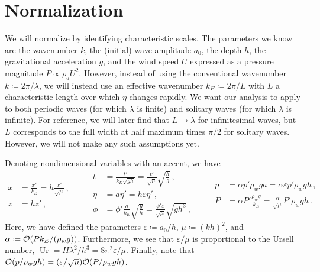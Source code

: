 \documentclass{jfm}
\DeclareMathOperator{\Ur}{Ur}
\renewcommand*{\epsilon}{\varepsilon}
\begin{document}
\section{Normalization}
We will normalize by identifying characteristic scales.
The parameters we know \apriori are the wavenumber $k$, the (initial)
wave amplitude $a_0$, the depth $h$, the gravitational acceleration $g$,
and the wind speed $U$ expressed as a pressure magnitude $P \propto
\rho_a U^2$.
However, instead of using the conventional wavenumber $k \coloneqq 2 \pi
/ \lambda$, we will instead use an effective wavenumber $k_E \coloneqq 2
\pi/ L$ with $L$ a characteristic length over which $\eta$ changes
rapidly.
We want our analysis to apply to both periodic waves (for which
$\lambda$ is finite) and solitary waves (for which $\lambda$ is
infinite).
For reference, we will later find that $L \to \lambda$ for infinitesimal
waves, but $L$ corresponds to the full width at half maximum times $\pi/2$ for solitary
waves.
However, we will not make any such assumptions yet.

Denoting nondimensional variables with an accent, we have
\begin{equation*}
  \begin{aligned}
  x &= \frac{x'}{k_E} = h \frac{x'}{\sqrt{\mu}}\,, \\
  z &= h z' \,,
  \end{aligned}
  \qquad
  \begin{aligned}
  t &= \frac{t'}{k_E\sqrt{g h}}
    = \frac{t'}{\sqrt{\mu}} \sqrt{\frac{h}{g}} \,, \\
  \eta &= a \eta' = h \epsilon \eta' \,, \\
  \phi &= \phi'\frac{a}{k_E}\sqrt{\frac{g}{h}}
    = \frac{\phi'\epsilon}{\sqrt{\mu}}\sqrt{g h^3} \,,
  \end{aligned}
  \qquad
  \begin{aligned}
  p &= \alpha p' \rho_w g a
    = \alpha \epsilon p' \rho_w g h \,, \\
  P &= \alpha P' \frac{\rho_w g}{k_E}
    = \frac{\alpha}{\sqrt{\mu}} P' \rho_w g h \,.
  \end{aligned}
\end{equation*}
Here, we have defined the parameters $\epsilon \coloneqq a_0/h$, $\mu
\coloneqq (kh)^2$, and $\alpha \coloneqq \order{P k_E/(\rho_w g
)}$.
Furthermore, we see that $\epsilon/\mu$ is proportional to the Ursell
number, $\Ur = H \lambda^2/h^3 = 8 \pi^2 \epsilon/\mu$.
Finally, note that $\order{p/\rho_w g h} = (\epsilon/\sqrt{\mu})
\order{P/\rho_w g h}$.
\end{document}
